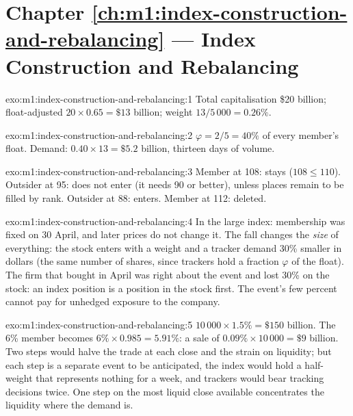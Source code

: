 \section*{Chapter \ref{ch:m1:index-construction-and-rebalancing} --- Index Construction and Rebalancing}

\begin{solution}{exo:m1:index-construction-and-rebalancing:1}
Total capitalisation \$20 billion; float-adjusted $20 \times 0.65 = \$13$
billion; weight $13/5\,000 = 0.26\%$.
\end{solution}

\begin{solution}{exo:m1:index-construction-and-rebalancing:2}
$\varphi = 2/5 = 40\%$ of every member's float. Demand: $0.40 \times 13 =
\$5.2$ billion, thirteen days of volume.
\end{solution}

\begin{solution}{exo:m1:index-construction-and-rebalancing:3}
Member at 108: stays ($108 \le 110$). Outsider at 95: does not enter (it
needs 90 or better), unless places remain to be filled by rank. Outsider at
88: enters. Member at 112: deleted.
\end{solution}

\begin{solution}{exo:m1:index-construction-and-rebalancing:4}
In the large index: membership was fixed on 30 April, and later prices do not
change it. The fall changes the \emph{size} of everything: the stock enters
with a weight and a tracker demand 30\% smaller in dollars (the same number
of shares, since trackers hold a fraction $\varphi$ of the float). The firm
that bought in April was right about the event and lost 30\% on the stock: an
index position is a position in the stock first. The event's few percent
cannot pay for unhedged exposure to the company.
\end{solution}

\begin{solution}{exo:m1:index-construction-and-rebalancing:5}
$10\,000 \times 1.5\% = \$150$ billion. The 6\% member becomes $6\% \times
0.985 = 5.91\%$: a sale of $0.09\% \times 10\,000 = \$9$ billion. Two steps
would halve the trade at each close and the strain on liquidity; but each
step is a separate event to be anticipated, the index would hold a
half-weight that represents nothing for a week, and trackers would bear
tracking decisions twice. One step on the most liquid close available
concentrates the liquidity where the demand is.
\end{solution}

